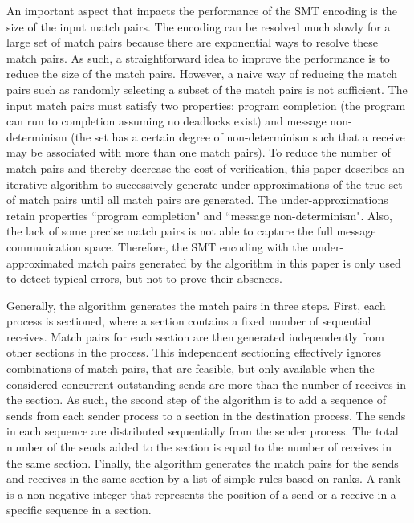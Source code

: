 An important aspect that impacts the performance of the SMT encoding is the size of the input match pairs. The encoding can be resolved much slowly for a large set of match pairs because there are exponential ways to resolve these match pairs. As such, a straightforward idea to improve the performance is to reduce the size of the match pairs. However, a naive way of reducing the match pairs such as randomly selecting a subset of the match pairs is not sufficient. The input match pairs must satisfy two properties: program completion (the program can run to completion assuming no deadlocks exist) and message non-determinism (the set has a certain degree of non-determinism such that a receive may be associated with more than one match pairs).  
To reduce the number of match pairs and thereby decrease the cost of verification, this paper describes an iterative algorithm to successively generate under-approximations of the true set of match pairs until all match pairs are generated. The under-approximations retain properties ``program completion" and ``message non-determinism". Also, the lack of some precise match pairs is not able to capture the full message communication space. Therefore, the SMT encoding with the under-approximated match pairs generated by the algorithm in this paper is only used to detect typical errors, but not to prove their absences.

Generally, the algorithm generates the match pairs in three steps. First, each process is sectioned, where a section contains a fixed number of sequential receives. 
Match pairs for each section are then generated independently from other sections in the process. This independent sectioning effectively ignores combinations of match pairs, that are feasible, but only available when the considered concurrent outstanding sends are more than the number of receives in the section. As such, the second step of the algorithm is to add a sequence of sends from each sender process to a section in the destination process. The sends in each sequence are distributed sequentially from the sender process. The total number of the sends added to the section is equal to the number of receives in the same section. Finally, the algorithm generates the match pairs for the sends and receives in the same section by a list of simple rules based on ranks. A rank is a non-negative integer that represents the position of a send or a receive in a specific sequence in a section.


